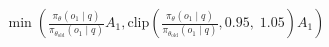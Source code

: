 \documentclass[preview]{standalone}
\begin{document}
\begin{align*}
\min \left(\frac{\pi_\theta(o_1 \mid q)}{\pi_{\theta_{\text{old}}}(o_1 \mid q)} A_1, \text{clip} \left( \frac{\pi_\theta(o_1 \mid q)}{\pi_{\theta_{\text{old}}}(o_1 \mid q)}, 0.95,\; 1.05 \right) A_1 \right)
\end{align*}
\end{document}
